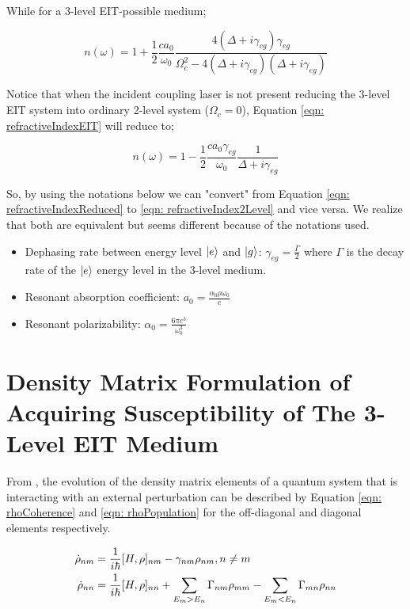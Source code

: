 While for a 3-level EIT-possible medium;

\begin{equation}
    n(\omega) = 1 + \frac{1}{2} \frac{c a_{0}}{\omega_{0}} \frac{4(\Delta + i\gamma_{cg})\gamma_{eg}}{\Omega_{c}^{2} - 4(\Delta + i\gamma_{cg})(\Delta + i\gamma_{eg})}
    \label{eqn: refractiveIndexEIT}
\end{equation}

Notice that when the incident coupling laser is not present reducing the 3-level EIT system into ordinary 2-level system ($\Omega_{c} = 0$), Equation \ref{eqn: refractiveIndexEIT} will reduce to;

\begin{equation}
    n(\omega) = 1 - \frac{1}{2} \frac{c a_{0} \gamma_{eg}}{\omega_{0}} \frac{1}{\Delta + i\gamma_{eg}}
    \label{eqn: refractiveIndexReduced}
\end{equation}

So, by using the notations below we can "convert" from Equation \ref{eqn: refractiveIndexReduced} to \ref{eqn: refractiveIndex2Level} and vice versa. We realize that both are equivalent but seems different because of the notations used.

\begin{itemize}
    \item Dephasing rate between energy level $\ket{e}$ and $\ket{g}$: $\gamma_{eg} = \frac{\Gamma}{2}$ where $\Gamma$ is the decay rate of the $\ket{e}$ energy level in the 3-level medium. 
    \item Resonant absorption coefficient: $a_{0} = \frac{\alpha_{0} \rho \omega_{0}}{c}$
    \item Resonant polarizability: $\alpha_{0} = \frac{6\pi c^{3}}{\omega_{0}^{3}}$
\end{itemize}


\section{Density Matrix Formulation of Acquiring Susceptibility of The 3-Level EIT Medium}
From \cite{boyd2020nonlinear}, the evolution of the density matrix elements of a quantum system that is interacting with an external perturbation can be described by Equation \ref{eqn: rhoCoherence} and \ref{eqn: rhoPopulation} for the off-diagonal and diagonal elements respectively.

\begin{align}
    \Dot{\rho}_{nm} &= \frac{1}{i\hbar} [H, \rho]_{nm} - \gamma_{nm} \rho_{nm}, \space n \neq m \label{eqn: rhoCoherence}\\
    \Dot{\rho}_{nn} &= \frac{1}{i\hbar} [H, \rho]_{nn} + \sum_{E_{m} > E_{n}} \Gamma_{nm}\rho_{mm} - \sum_{E_{m} < E_{n}} \Gamma_{mn} \rho_{nn} \label{eqn: rhoPopulation}
\end{align} 

